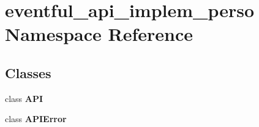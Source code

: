 \section{eventful\+\_\+api\+\_\+implem\+\_\+perso Namespace Reference}
\label{namespaceeventful__api__implem__perso}
\subsection*{Classes}
\begin{DoxyCompactItemize}
\item 
class {\bf A\+PI}
\item 
class {\bf A\+P\+I\+Error}
\end{DoxyCompactItemize}
